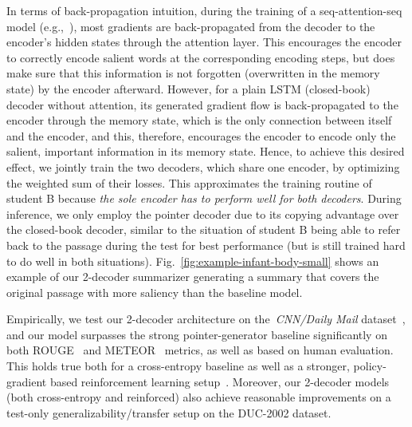 \documentclass[11pt,a4paper]{article}
\def\figref#1{Fig.~\ref{#1}}
\begin{document}
\label{sec 1}
In terms of back-propagation intuition, during the training of a seq-attention-seq model (e.g.,~), most gradients are back-propagated from the decoder to the encoder's hidden states through the attention layer. This encourages the encoder to correctly encode salient words at the corresponding encoding steps, but does make sure that this information is not forgotten (overwritten in the memory state) by the encoder afterward. 
However, for a plain LSTM (closed-book) decoder without attention, its generated gradient flow is back-propagated to the encoder through the memory state, which is the only connection between itself and the encoder, and this, therefore, encourages the encoder to encode only the salient, important information in its memory state.
Hence, to achieve this desired effect, we jointly train the two decoders, which share one encoder, by optimizing the weighted sum of their losses. 
This approximates the training routine of student B because \emph{the sole encoder has to perform well for both decoders}.
During inference, we only employ the pointer decoder due to its copying advantage over the closed-book decoder, similar to the situation of student B being able to refer back to the passage during the test for best performance (but is still trained hard to do well in both situations).
\figref{fig:example-infant-body-small} shows an example of our 2-decoder summarizer generating a summary that covers the original passage with more saliency than the baseline model.

Empirically, we test our 2-decoder architecture on the~\emph{CNN/Daily Mail} dataset~\cite{Hermann:15,Nallapati:16}, and our model surpasses the strong pointer-generator baseline significantly on both ROUGE~\cite{Lin:04} and METEOR~\cite{Denkowski:14} metrics, as well as based on  human evaluation. This holds true both for a cross-entropy baseline as well as a stronger, policy-gradient based reinforcement learning setup~\cite{Williams:92}. 
Moreover, our 2-decoder models (both cross-entropy and reinforced) also achieve reasonable improvements on a test-only generalizability/transfer setup on the DUC-2002  dataset.
\end{document}
